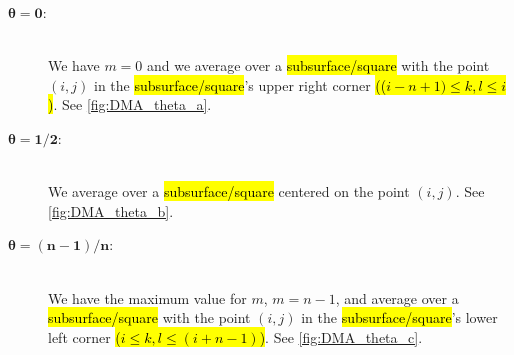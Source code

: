 %
\begin{description}
    \item[$\bm{\theta = 0}$:] \hfill\\ 
        We have $m=0$ and we average over a \hl{subsurface/square} with the point $(i,j)$ in the \hl{subsurface/square}'s upper right corner \hl{(($i-n+1) \leq k,l \leq i$)}. See \cref{fig:DMA_theta_a}.
    \item[$\bm{\theta = 1/2}$:] \hfill\\ 
        We average over a \hl{subsurface/square} centered on the point $(i,j)$. See \cref{fig:DMA_theta_b}.
    \item[$\bm{\theta = (n-1)/n}$:] \hfill\\ 
        {\sloppy 
        We have the maximum value for $m$, $m=n-1$, and average over a \hl{subsurface/square} with the point $(i,j)$ in the \hl{subsurface/square}'s lower left corner  \hl{(${i \leq k,l \leq (i+n-1)}$)}. See \cref{fig:DMA_theta_c}.
        }
\end{description}%
%
